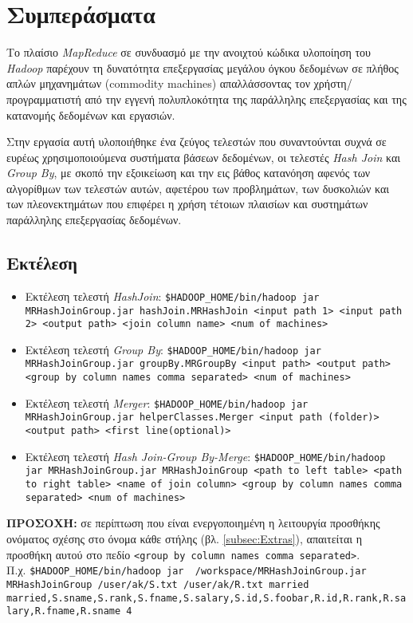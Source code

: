 \documentclass{article}
\newcommand{\en}[1]{\foreignlanguage{english}{#1}}
\begin{document}
\section{Συμπεράσματα} \label{sec:Eval}

Το πλαίσιο \emph{\en{MapReduce}} σε συνδυασμό με την ανοιχτού κώδικα υλοποίηση του \emph{\en{Hadoop}} παρέχουν τη δυνατότητα επεξεργασίας μεγάλου όγκου δεδομένων σε πλήθος απλών μηχανημάτων (\en{commodity machines}) απαλλάσσοντας τον χρήστη/προγραμματιστή από την εγγενή πολυπλοκότητα της παράλληλης επεξεργασίας και της κατανομής δεδομένων και εργασιών.

Στην εργασία αυτή υλοποιήθηκε ένα ζεύγος τελεστών που συναντούνται συχνά σε ευρέως χρησιμοποιούμενα συστήματα βάσεων δεδομένων, οι τελεστές \emph{\en{Hash Join}} και \emph{\en{Group By}}, με σκοπό την εξοικείωση και την εις βάθος κατανόηση αφενός των αλγορίθμων των τελεστών αυτών, αφετέρου των προβλημάτων, των δυσκολιών και των πλεονεκτημάτων που επιφέρει η χρήση τέτοιων πλαισίων και συστημάτων παράλληλης επεξεργασίας δεδομένων.

\newpage
\begin{appendices}
\section{Εκτέλεση} \label{app:Running}
\begin{itemize}
\item Εκτέλεση τελεστή \emph{\en{HashJoin}}: \texttt{\en{\$HADOOP\_HOME/bin/hadoop jar MRHashJoinGroup.jar hashJoin.MRHashJoin <input path 1> <input path 2> <output path> <join column name> <num of machines>}}

\item Εκτέλεση τελεστή \emph{\en{Group By}}: \texttt{\en{\$HADOOP\_HOME/bin/hadoop jar MRHashJoinGroup.jar groupBy.MRGroupBy  <input path> <output path> <group by column names comma separated> <num of machines>}}

\item Εκτέλεση τελεστή \emph{\en{Merger}}: \texttt{\en{\$HADOOP\_HOME/bin/hadoop jar MRHashJoinGroup.jar helperClasses.Merger <input path (folder)> <output path> <first line(optional)>}}

\item Εκτέλεση τελεστή \emph{\en{Hash Join-Group By-Merge}}: \texttt{\en{\$HADOOP\_HOME/bin/hadoop jar MRHashJoinGroup.jar MRHashJoinGroup <path to left table> <path to right table> <name of join column> <group by column names comma separated> <num of machines>}}
\end{itemize}
\textbf{ΠΡΟΣΟΧΉ:} σε περίπτωση που είναι ενεργοποιημένη η λειτουργία προσθήκης ονόματος σχέσης στο όνομα κάθε στήλης (βλ. \ref{subsec:Extras}), απαιτείται η προσθήκη αυτού στο πεδίο \texttt{\en{<group by column names comma separated>}}. \\ Π.χ. \texttt{\en{\$HADOOP\_HOME/bin/hadoop jar ~/workspace/MRHashJoinGroup.jar MRHashJoinGroup /user/ak/S.txt /user/ak/R.txt married \\ married,S.sname,S.rank,S.fname,S.salary,S.id,S.foobar,R.id,R.rank,R.salary,R.fname,R.sname 4}}\\
\end{appendices}
\end{document}

